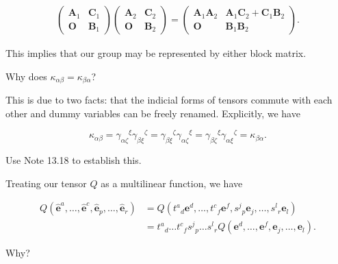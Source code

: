 \documentclass[../the-road-to-reality.tex]{subfiles}
\begin{document}
\begin{questions}
\begin{solution}
	\begin{gather*}
		\begin{pmatrix}
			\mathbf{A}_1 & \mathbf{C}_1 \\
			\mathbf{O} & \mathbf{B}_1
		\end{pmatrix}
		\begin{pmatrix}
			\mathbf{A}_2 & \mathbf{C}_2 \\
			\mathbf{O} & \mathbf{B}_2
		\end{pmatrix}
		= 
		\begin{pmatrix}
		\mathbf{A}_1\mathbf{A}_2 & \mathbf{A}_1\mathbf{C}_2 + \mathbf{C}_1\mathbf{B}_2 \\
		\mathbf{O} & \mathbf{B}_1\mathbf{B}_2
		\end{pmatrix}.
	\end{gather*}

        This implies that our group may be represented by either block matrix.
\end{solution}

\question Why does $\kappa_{\alpha\beta} = \kappa_{\beta\alpha}$?

\begin{solution}
        This is due to two facts: that the indicial forms of tensors commute with each other and dummy variables can be freely renamed. Explicitly, we have

	\[
        \kappa_{\alpha\beta} = {\gamma_{\alpha\zeta}}^\xi{\gamma_{\beta\xi}}^\zeta = {\gamma_{\beta\xi}}^\zeta{\gamma_{\alpha\zeta}}^\xi = {\gamma_{\beta\zeta}}^\xi{\gamma_{\alpha\xi}}^\zeta = \kappa_{\beta\alpha}
	.\] 
\end{solution}

\question Use Note 13.18 to establish this.

\begin{solution}
	Treating our tensor $Q$ as a multilinear function, we have

	\begin{align*}
		{Q}(\hat{\mathbf{e}}^a, \dots, \hat{\mathbf{e}}^c, \hat{\mathbf{e}}_p, \dots, \hat{\mathbf{e}}_r) &={Q}({t^a}_d{\mathbf{e}}^d, \dots, {t^c}_f{\mathbf{e}}^f, {s^j}_p{\mathbf{e}}_j, \dots, {s^l}_r{\mathbf{e}}_l) \\
		&={t^a}_d\dots{t^c}_f{s^j}_p\dots{s^l}_r{Q}({\mathbf{e}}^d, \dots, {\mathbf{e}}^f, {\mathbf{e}}_j, \dots, {\mathbf{e}}_l).
	\end{align*}
\end{solution}

\question Why?


\end{questions}
\end{document}
